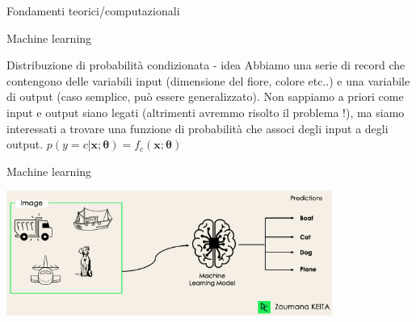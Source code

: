 \documentclass[11pt]{beamer}
\begin{document}
\begin{frame}
\begin{center}
\Huge
Fondamenti teorici/computazionali
\end{center}
\end{frame}


\begin{frame}{Machine learning \cite{pml1Book,pml2Book,classification_datacamp}}

\begin{alertblock}{Distribuzione di probabilità condizionata - idea }
Abbiamo una serie di record che contengono delle variabili  input (dimensione del fiore, colore etc..) e una variabile di output (caso semplice, può essere generalizzato). Non sappiamo a priori come input e output siano legati (altrimenti avremmo risolto il problema !), ma siamo interessati a trovare una funzione di probabilità che associ degli input a degli output. $p(y=c|\textbf{x};\bm{\theta})=f_{c}(\textbf{x};\bm{\theta})$
\end{alertblock}


\end{frame}

\begin{frame}{Machine learning \cite{pml1Book,pml2Book,classification_datacamp}}
\begin{center}
\includegraphics[width=0.8\textwidth]{Pic/4_label_classification_task_Datacamp.png}
\end{center}


\end{frame}
\end{document}
